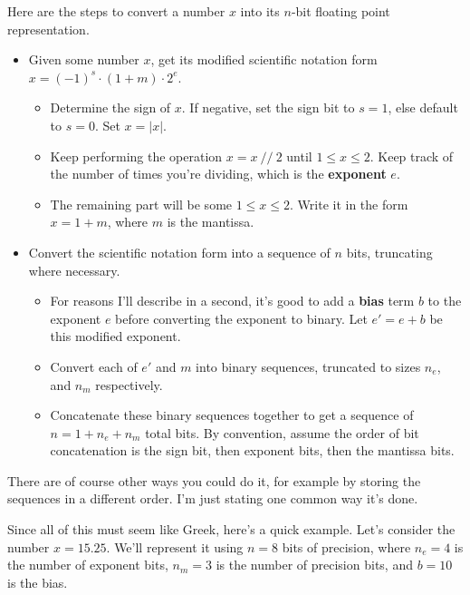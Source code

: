 \documentclass[
  letterpaper,
  DIV=11,
  numbers=noendperiod]{scrreprt}
\providecommand{\tightlist}{%
  \setlength{\itemsep}{0pt}\setlength{\parskip}{0pt}}\usepackage{longtable,booktabs,array}
\begin{document}
Here are the steps to convert a number \(x\) into its \(n\)-bit floating
point representation.

\begin{itemize}
\tightlist
\item
  Given some number \(x\), get its modified scientific notation form
  \(x = (-1)^s \cdot (1+m) \cdot 2^e\).

  \begin{itemize}
  \tightlist
  \item
    Determine the sign of \(x\). If negative, set the sign bit to
    \(s=1\), else default to \(s=0\). Set \(x = |x|\).
  \item
    Keep performing the operation \(x = x \ // \ 2\) until
    \(1 \leq x \leq 2\). Keep track of the number of times you're
    dividing, which is the \textbf{exponent} \(e\).
  \item
    The remaining part will be some \(1 \leq x \leq 2\). Write it in the
    form \(x = 1 + m\), where \(m\) is the mantissa.
  \end{itemize}
\item
  Convert the scientific notation form into a sequence of \(n\) bits,
  truncating where necessary.

  \begin{itemize}
  \tightlist
  \item
    For reasons I'll describe in a second, it's good to add a
    \textbf{bias} term \(b\) to the exponent \(e\) before converting the
    exponent to binary. Let \(e'=e+b\) be this modified exponent.
  \item
    Convert each of \(e'\) and \(m\) into binary sequences, truncated to
    sizes \(n_e\), and \(n_m\) respectively.
  \item
    Concatenate these binary sequences together to get a sequence of
    \(n=1+n_e+n_m\) total bits. By convention, assume the order of bit
    concatenation is the sign bit, then exponent bits, then the mantissa
    bits.
  \end{itemize}
\end{itemize}

There are of course other ways you could do it, for example by storing
the sequences in a different order. I'm just stating one common way it's
done.

Since all of this must seem like Greek, here's a quick example. Let's
consider the number \(x=15.25\). We'll represent it using \(n=8\) bits
of precision, where \(n_e=4\) is the number of exponent bits, \(n_m=3\)
is the number of precision bits, and \(b=10\) is the bias.
\end{document}
